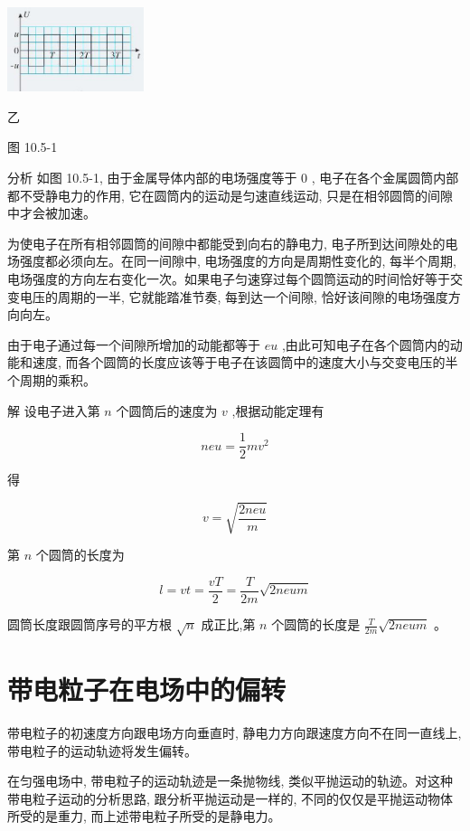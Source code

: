 \documentclass[10pt]{article}
\begin{document}
\begin{center}
\includegraphics[max width=0.3\textwidth]{images/01911d5f-8e38-70c0-b5b8-2b399bd115b6_50_990120.jpg}
\end{center}

乙

图 10.5-1

分析 如图 10.5-1, 由于金属导体内部的电场强度等于 0 , 电子在各个金属圆筒内部都不受静电力的作用, 它在圆筒内的运动是匀速直线运动, 只是在相邻圆筒的间隙中才会被加速。

为使电子在所有相邻圆筒的间隙中都能受到向右的静电力, 电子所到达间隙处的电场强度都必须向左。在同一间隙中, 电场强度的方向是周期性变化的, 每半个周期, 电场强度的方向左右变化一次。如果电子匀速穿过每个圆筒运动的时间恰好等于交变电压的周期的一半, 它就能踏准节奏, 每到达一个间隙, 恰好该间隙的电场强度方向向左。

由于电子通过每一个间隙所增加的动能都等于 \({eu}\) ,由此可知电子在各个圆筒内的动能和速度, 而各个圆筒的长度应该等于电子在该圆筒中的速度大小与交变电压的半个周期的乘积。

解 设电子进入第 \(n\) 个圆筒后的速度为 \(v\) ,根据动能定理有

\[
{neu} = \frac{1}{2}m{v}^{2}
\]

得

\[
v = \sqrt{\frac{2neu}{m}}
\]

第 \(n\) 个圆筒的长度为

\[
l = {vt} = \frac{vT}{2} = \frac{T}{2m}\sqrt{2neum}
\]

圆筒长度跟圆筒序号的平方根 \(\sqrt{n}\) 成正比,第 \(n\) 个圆筒的长度是 \(\frac{T}{2m}\sqrt{2neum}\) 。

\section*{带电粒子在电场中的偏转}

带电粒子的初速度方向跟电场方向垂直时, 静电力方向跟速度方向不在同一直线上, 带电粒子的运动轨迹将发生偏转。

在匀强电场中, 带电粒子的运动轨迹是一条抛物线, 类似平抛运动的轨迹。对这种带电粒子运动的分析思路, 跟分析平抛运动是一样的, 不同的仅仅是平抛运动物体所受的是重力, 而上述带电粒子所受的是静电力。
\end{document}
